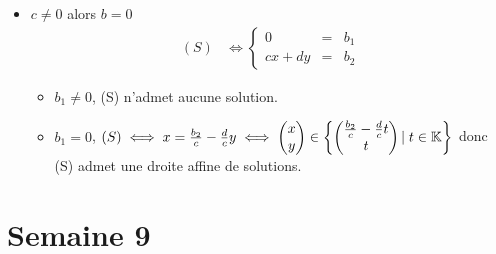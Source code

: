 \documentclass{article}
\begin{document}
\begin{question_kholle}
\begin{itemize}[label=$\bullet$ Supposons]
\begin{itemize}[label=$\bullet$ Si]
\begin{itemize}[label=$\bullet$ Si]
\begin{itemize}[label=$\bullet$ Si]
					\end{itemize}
				\end{itemize}
				\item $c \neq 0$ alors $b = 0$
				\begin{equation*}
					\begin{aligned}
						(S)
						&\iff \left\{ \begin{array}{ccc}
							0 &=& b_1 \\
							cx + dy &=& b_2
						\end{array} \right.
					\end{aligned}
				\end{equation*}
				\begin{itemize}[label=$\bullet$ Si]
					\item $b_1 \neq 0$, (S) n'admet aucune solution.
					\item $b_1 = 0$, $(S) \iff x = \frac{b_2}{c} - \frac{d}{c}y \iff \begin{pmatrix} x \\ y \end{pmatrix} \in \begin{Bmatrix} \begin{pmatrix} \frac{b_2}{c} - \frac{d}{c}t \\ t \end{pmatrix} |\; t \in \mathbb K \end{Bmatrix}$ donc (S) admet une droite affine de solutions.
				\end{itemize}
			\end{itemize}
		\end{itemize}
		
	\end{question_kholle}

\pagebreak\section{Semaine 9}
	
\end{document}

